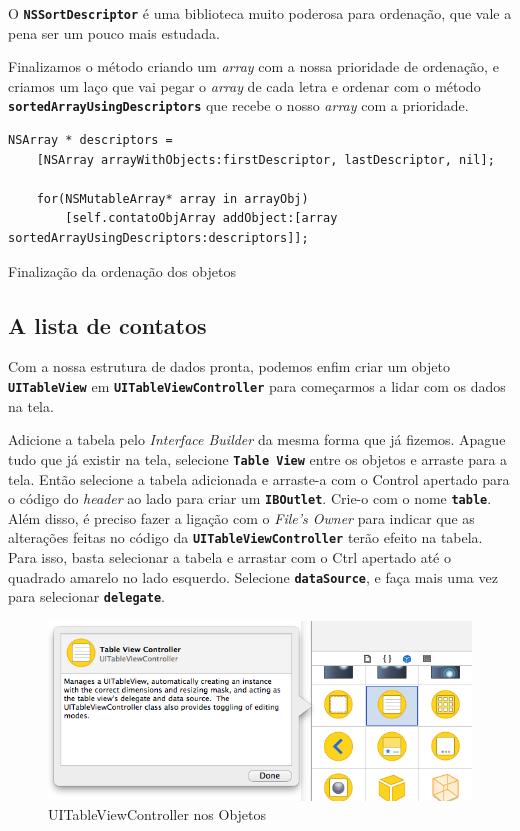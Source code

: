 \documentclass[a4paper,12pt,brazil,oneside]{book}
\begin{document}
O \texttt{\textbf{NSSortDescriptor}} é uma biblioteca muito poderosa para ordenação, que vale a pena ser um pouco mais estudada.

Finalizamos o método criando um \emph{array} com a nossa prioridade de ordenação, e criamos um laço que vai pegar o \emph{array} de cada letra e ordenar com o método \texttt{\textbf{sortedArrayUsingDescriptors}} que recebe o nosso \emph{array} com a prioridade.

\begin{listing}[H]
\begin{verbatim}
NSArray * descriptors =
    [NSArray arrayWithObjects:firstDescriptor, lastDescriptor, nil];
      
    for(NSMutableArray* array in arrayObj)
        [self.contatoObjArray addObject:[array sortedArrayUsingDescriptors:descriptors]];
\end{verbatim}
\caption{Finalização da ordenação dos objetos}
\end{listing}

\subsection{A lista de contatos}


Com a nossa estrutura de dados pronta, podemos enfim criar um objeto \texttt{\textbf{UITableView}} em \texttt{\textbf{UITableViewController}} para começarmos a lidar com os dados na tela.

Adicione a tabela pelo \emph{Interface Builder} da mesma forma que já fizemos. Apague tudo que já existir na tela, selecione \texttt{\textbf{Table View}} entre os objetos e arraste para a tela. Então selecione a tabela adicionada e arraste-a com o Control apertado para o código do \emph{header} ao lado para criar um \texttt{\textbf{IBOutlet}}. Crie-o com o nome \texttt{\textbf{table}}. Além disso, é preciso fazer a ligação com o \emph{File's Owner} para indicar que as alterações feitas no código da \texttt{\textbf{UITableViewController}} terão efeito na tabela. Para isso, basta selecionar a tabela e arrastar com o Ctrl apertado até o quadrado amarelo no lado esquerdo. Selecione \texttt{\textbf{dataSource}}, e faça mais uma vez para selecionar \texttt{\textbf{delegate}}.

\begin{figure}[H]
  \centering
  \includegraphics[width=.75\textwidth]{figuras/table/table8.png}
  \caption{UITableViewController nos Objetos}
  \label{fig:a}
\end{figure}
\end{document}
